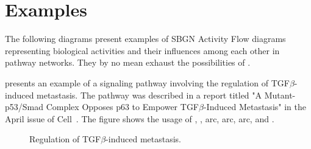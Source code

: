 
\chapter{Examples}
\label{af:example}


The following diagrams present examples of SBGN Activity Flow diagrams representing biological activities and their influences among each other in pathway networks.  They by no mean exhaust the possibilities of \SBGNAFLone.

 presents an example of a signaling pathway involving the regulation of TGF$\beta$-induced metastasis.  The pathway was described in a report titled "A Mutant-p53/Smad Complex Opposes p63 to Empower TGF$\beta$-Induced Metastasis" in the April issue of Cell~\cite{Adorno:2009}.  The figure shows the usage of , ,  arc,  arc,  arc, and .

\begin{figure}
\begin{center}
\caption{Regulation of TGF$\beta$-induced metastasis.}\label{fig:TGF}
\end{center}
\end{figure}

